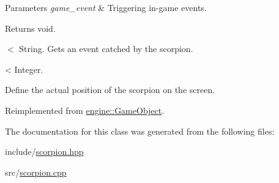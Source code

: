\begin{DoxyParams}{Parameters}
{\em game\+\_\+event} & Triggering in-\/game events. \\
\hline
\end{DoxyParams}
\begin{DoxyReturn}{Returns}
void. 
\end{DoxyReturn}
$<$ String. Gets an event catched by the scorpion. \begin{DoxyVerb}                        < Integer.
\end{DoxyVerb}
 Define the actual position of the scorpion on the screen. 

Reimplemented from \hyperlink{classengine_1_1_game_object}{engine\+::\+Game\+Object}.



The documentation for this class was generated from the following files\+:\begin{DoxyCompactItemize}
\item 
include/\hyperlink{scorpion_8hpp}{scorpion.\+hpp}\item 
src/\hyperlink{scorpion_8cpp}{scorpion.\+cpp}\end{DoxyCompactItemize}
